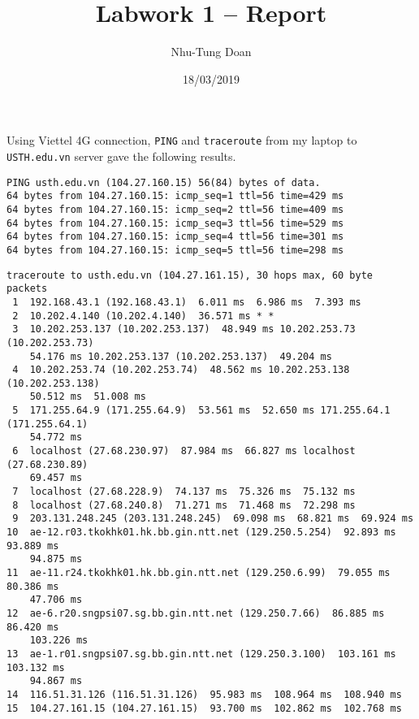 \documentclass[12pt]{article}
\title{Labwork 1 -- Report}
\author{Nhu-Tung Doan}
\date{18/03/2019}
\begin{document}
\maketitle

Using Viettel 4G connection, \texttt{PING} and \texttt{traceroute} from my laptop to \texttt{USTH.edu.vn} server gave the following results.

\begin{verbatim}
PING usth.edu.vn (104.27.160.15) 56(84) bytes of data.
64 bytes from 104.27.160.15: icmp_seq=1 ttl=56 time=429 ms
64 bytes from 104.27.160.15: icmp_seq=2 ttl=56 time=409 ms
64 bytes from 104.27.160.15: icmp_seq=3 ttl=56 time=529 ms
64 bytes from 104.27.160.15: icmp_seq=4 ttl=56 time=301 ms
64 bytes from 104.27.160.15: icmp_seq=5 ttl=56 time=298 ms
\end{verbatim}

\begin{verbatim}
traceroute to usth.edu.vn (104.27.161.15), 30 hops max, 60 byte packets
 1  192.168.43.1 (192.168.43.1)  6.011 ms  6.986 ms  7.393 ms
 2  10.202.4.140 (10.202.4.140)  36.571 ms * *
 3  10.202.253.137 (10.202.253.137)  48.949 ms 10.202.253.73 (10.202.253.73)
    54.176 ms 10.202.253.137 (10.202.253.137)  49.204 ms
 4  10.202.253.74 (10.202.253.74)  48.562 ms 10.202.253.138 (10.202.253.138)
    50.512 ms  51.008 ms
 5  171.255.64.9 (171.255.64.9)  53.561 ms  52.650 ms 171.255.64.1 (171.255.64.1)
    54.772 ms
 6  localhost (27.68.230.97)  87.984 ms  66.827 ms localhost (27.68.230.89)
    69.457 ms
 7  localhost (27.68.228.9)  74.137 ms  75.326 ms  75.132 ms
 8  localhost (27.68.240.8)  71.271 ms  71.468 ms  72.298 ms
 9  203.131.248.245 (203.131.248.245)  69.098 ms  68.821 ms  69.924 ms
10  ae-12.r03.tkokhk01.hk.bb.gin.ntt.net (129.250.5.254)  92.893 ms  93.889 ms
    94.875 ms
11  ae-11.r24.tkokhk01.hk.bb.gin.ntt.net (129.250.6.99)  79.055 ms  80.386 ms
    47.706 ms
12  ae-6.r20.sngpsi07.sg.bb.gin.ntt.net (129.250.7.66)  86.885 ms  86.420 ms
    103.226 ms
13  ae-1.r01.sngpsi07.sg.bb.gin.ntt.net (129.250.3.100)  103.161 ms  103.132 ms
    94.867 ms
14  116.51.31.126 (116.51.31.126)  95.983 ms  108.964 ms  108.940 ms
15  104.27.161.15 (104.27.161.15)  93.700 ms  102.862 ms  102.768 ms
\end{verbatim}
\end{document}
